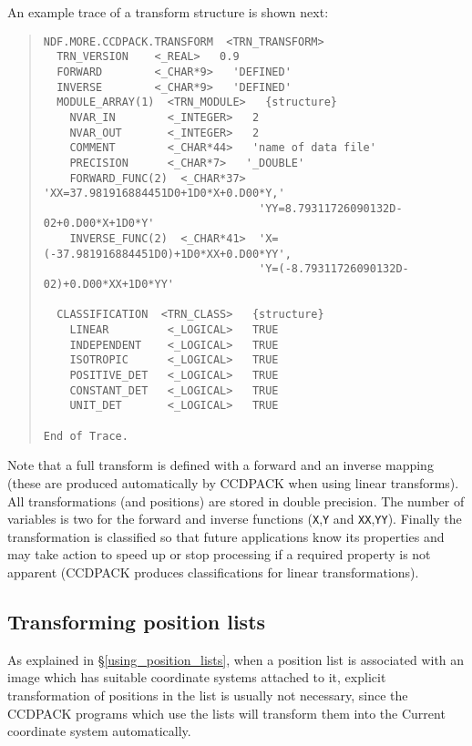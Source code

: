 \documentclass[twoside,11pt]{article}
\newcommand{\hyperref}[4]{#2\ref{#4}#3}
\newcommand{\latexhtml}[2]{#1}
\newcommand{\xlabel}[1]{}
\renewcommand{\_}{\texttt{\symbol{95}}}
\newcommand{\ttsize}{\latexhtml{\small}{}}
\newenvironment{myquote}{\begin{quote}\ttsize}{\end{quote}}
\newcommand{\text}[1]{{\ttsize \tt #1}}
\begin{document}
An example trace of a transform structure is shown next:
\begin{myquote}
\begin{verbatim}
NDF.MORE.CCDPACK.TRANSFORM  <TRN_TRANSFORM>
  TRN_VERSION    <_REAL>   0.9
  FORWARD        <_CHAR*9>   'DEFINED'
  INVERSE        <_CHAR*9>   'DEFINED'
  MODULE_ARRAY(1)  <TRN_MODULE>   {structure}
    NVAR_IN        <_INTEGER>   2
    NVAR_OUT       <_INTEGER>   2
    COMMENT        <_CHAR*44>   'name of data file'
    PRECISION      <_CHAR*7>   '_DOUBLE'
    FORWARD_FUNC(2)  <_CHAR*37>  'XX=37.981916884451D0+1D0*X+0.D00*Y,'
                                 'YY=8.79311726090132D-02+0.D00*X+1D0*Y'
    INVERSE_FUNC(2)  <_CHAR*41>  'X=(-37.981916884451D0)+1D0*XX+0.D00*YY',
                                 'Y=(-8.79311726090132D-02)+0.D00*XX+1D0*YY'

  CLASSIFICATION  <TRN_CLASS>   {structure}
    LINEAR         <_LOGICAL>   TRUE
    INDEPENDENT    <_LOGICAL>   TRUE
    ISOTROPIC      <_LOGICAL>   TRUE
    POSITIVE_DET   <_LOGICAL>   TRUE
    CONSTANT_DET   <_LOGICAL>   TRUE
    UNIT_DET       <_LOGICAL>   TRUE

End of Trace.
\end{verbatim}
\end{myquote}
Note that a full transform is defined with a forward and an inverse
mapping (these are produced automatically by CCDPACK when using linear
transforms). All transformations (and positions) are stored in double
precision. The number of variables is two for the forward and inverse
functions (\text{X},\text{Y} and \text{XX},\text{YY}). Finally
the transformation is classified so that future applications know its
properties and may take action to speed up or stop processing if a
required property is not apparent (CCDPACK produces classifications for
linear transformations).


\subsection{Transforming\xlabel{transformingpositions} position lists}

As explained in
\hyperref{the section on position lists}{\S}{}{using_position_lists}, 
when a position list is associated with an image which has
suitable coordinate systems attached to it,
explicit transformation of positions in the list is usually not necessary,
since the CCDPACK programs which use the lists will transform them
into the Current coordinate system automatically.
\end{document}
